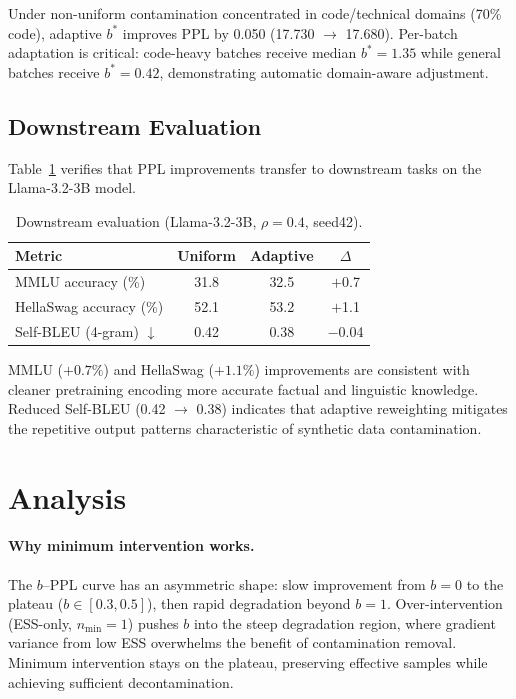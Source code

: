 \documentclass[11pt,a4paper]{article}
\newcommand{\bstar}{b^{*}}
\newcommand{\nmin}{n_{\min}}
\begin{document}
Under non-uniform contamination concentrated in code/technical domains (70\% code), adaptive $\bstar$ improves PPL by 0.050 (17.730 $\to$ 17.680).
Per-batch adaptation is critical: code-heavy batches receive median $\bstar = 1.35$ while general batches receive $\bstar = 0.42$, demonstrating automatic domain-aware adjustment.


\subsection{Downstream Evaluation}
\label{sec:downstream}

Table~\ref{tab:downstream} verifies that PPL improvements transfer to downstream tasks on the Llama-3.2-3B model.

\begin{table}[t]
\centering
\small
\caption{Downstream evaluation (Llama-3.2-3B, $\rho{=}0.4$, seed42).}
\label{tab:downstream}
\begin{tabular}{lccc}
\toprule
\textbf{Metric} & \textbf{Uniform} & \textbf{Adaptive} & $\Delta$ \\
\midrule
MMLU accuracy (\%)     & 31.8 & 32.5 & $+$0.7 \\
HellaSwag accuracy (\%) & 52.1 & 53.2 & $+$1.1 \\
Self-BLEU (4-gram) $\downarrow$ & 0.42 & 0.38 & $-$0.04 \\
\bottomrule
\end{tabular}
\end{table}

MMLU ($+0.7\%$) and HellaSwag ($+1.1\%$) improvements are consistent with cleaner pretraining encoding more accurate factual and linguistic knowledge.
Reduced Self-BLEU (0.42 $\to$ 0.38) indicates that adaptive reweighting mitigates the repetitive output patterns characteristic of synthetic data contamination.


\section{Analysis}
\label{sec:analysis}

\paragraph{Why minimum intervention works.}
The $b$--PPL curve has an asymmetric shape: slow improvement from $b{=}0$ to the plateau ($b \in [0.3, 0.5]$), then rapid degradation beyond $b{=}1$.
Over-intervention (ESS-only, $\nmin{=}1$) pushes $b$ into the steep degradation region, where gradient variance from low ESS overwhelms the benefit of contamination removal.
Minimum intervention stays on the plateau, preserving effective samples while achieving sufficient decontamination.
\end{document}
